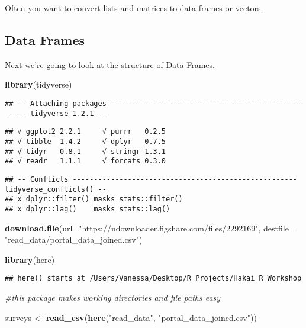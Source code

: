 \documentclass[]{article}
\newenvironment{Shaded}{\begin{snugshade}}{\end{snugshade}}
\newcommand{\KeywordTok}[1]{\textcolor[rgb]{0.13,0.29,0.53}{\textbf{#1}}}
\newcommand{\DataTypeTok}[1]{\textcolor[rgb]{0.13,0.29,0.53}{#1}}
\newcommand{\StringTok}[1]{\textcolor[rgb]{0.31,0.60,0.02}{#1}}
\newcommand{\CommentTok}[1]{\textcolor[rgb]{0.56,0.35,0.01}{\textit{#1}}}
\newcommand{\NormalTok}[1]{#1}
\begin{document}
Often you want to convert lists and matrices to data frames or vectors.

\subsection{Data Frames}\label{data-frames}

Next we're going to look at the structure of Data Frames.

\begin{Shaded}
\begin{Highlighting}[]
\KeywordTok{library}\NormalTok{(tidyverse)}
\end{Highlighting}
\end{Shaded}

\begin{verbatim}
## -- Attaching packages -------------------------------------------------- tidyverse 1.2.1 --
\end{verbatim}

\begin{verbatim}
## √ ggplot2 2.2.1     √ purrr   0.2.5
## √ tibble  1.4.2     √ dplyr   0.7.5
## √ tidyr   0.8.1     √ stringr 1.3.1
## √ readr   1.1.1     √ forcats 0.3.0
\end{verbatim}

\begin{verbatim}
## -- Conflicts ----------------------------------------------------- tidyverse_conflicts() --
## x dplyr::filter() masks stats::filter()
## x dplyr::lag()    masks stats::lag()
\end{verbatim}

\begin{Shaded}
\begin{Highlighting}[]
\KeywordTok{download.file}\NormalTok{(}\DataTypeTok{url=}\StringTok{"https://ndownloader.figshare.com/files/2292169"}\NormalTok{, }\DataTypeTok{destfile =} \StringTok{"read_data/portal_data_joined.csv"}\NormalTok{)}

\KeywordTok{library}\NormalTok{(here)}
\end{Highlighting}
\end{Shaded}

\begin{verbatim}
## here() starts at /Users/Vanessa/Desktop/R Projects/Hakai R Workshop
\end{verbatim}

\begin{Shaded}
\begin{Highlighting}[]
\CommentTok{#this package makes working directories and file paths easy}

\NormalTok{surveys <-}\StringTok{ }\KeywordTok{read_csv}\NormalTok{(}\KeywordTok{here}\NormalTok{(}\StringTok{"read_data"}\NormalTok{, }\StringTok{"portal_data_joined.csv"}\NormalTok{))}
\end{Highlighting}
\end{Shaded}
\end{document}
